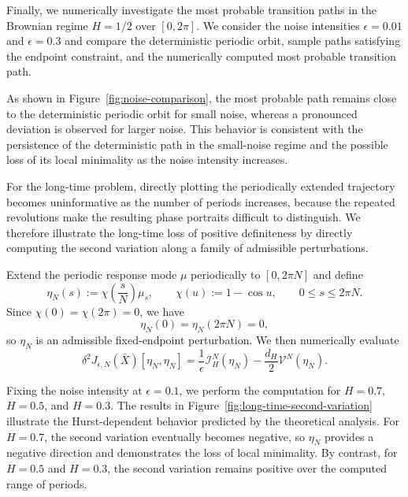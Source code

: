 \documentclass[preprint,12pt]{elsarticle}
\theoremstyle{definition}
\theoremstyle{plain}
\begin{document}
Finally, we numerically investigate the most probable transition paths
in the Brownian regime $H=1/2$ over $[0,2\pi]$. We consider the noise
intensities $\epsilon=0.01$ and $\epsilon=0.3$ and compare the
deterministic periodic orbit, sample paths satisfying the endpoint
constraint, and the numerically computed most probable transition
path.

As shown in Figure~\ref{fig:noise-comparison}, the most probable path
remains close to the deterministic periodic orbit for small noise,
whereas a pronounced deviation is observed for larger noise. This
behavior is consistent with the persistence of the deterministic path
in the small-noise regime and the possible loss of its local
minimality as the noise intensity increases.

For the long-time problem, directly plotting the periodically extended
trajectory becomes uninformative as the number of periods increases,
because the repeated revolutions make the resulting phase portraits
difficult to distinguish. We therefore illustrate the long-time loss
of positive definiteness by directly computing the second variation
along a family of admissible perturbations.

Extend the periodic response mode $\mu$ periodically to $[0,2\pi N]$
and define
\begin{equation}
\label{eq:numerical-perturbation}
    \eta_N(s)
    :=
    \chi\left(\frac{s}{N}\right)\mu_s,
    \qquad
    \chi(u):=1-\cos u,
    \qquad
    0\leq s\leq2\pi N.
\end{equation}
Since $\chi(0)=\chi(2\pi)=0$, we have
\begin{equation*}
    \eta_N(0)=\eta_N(2\pi N)=0,
\end{equation*}
so $\eta_N$ is an admissible fixed-endpoint perturbation. We then
numerically evaluate
\begin{equation*}
    \delta^2J_{\epsilon,N}(\bar X)[\eta_N,\eta_N]
    =
    \frac{1}{\epsilon}\mathcal I_H^N(\eta_N)
    -
    \frac{d_H}{2}\mathcal V^N(\eta_N).
\end{equation*}

Fixing the noise intensity at $\epsilon=0.1$, we perform the computation
for $H=0.7$, $H=0.5$, and $H=0.3$. The results in
Figure~\ref{fig:long-time-second-variation} illustrate the
Hurst-dependent behavior predicted by the theoretical analysis. For
$H=0.7$, the second variation eventually becomes negative, so
$\eta_N$ provides a negative direction and demonstrates the loss of
local minimality. By contrast, for $H=0.5$ and $H=0.3$, the second
variation remains positive over the computed range of periods.
\end{document}
